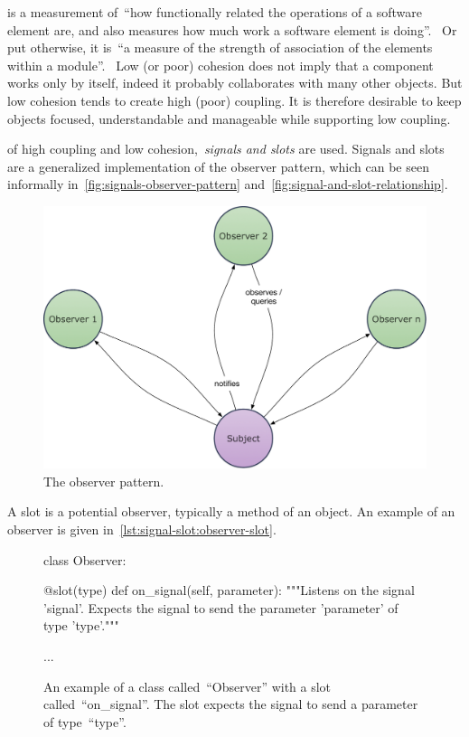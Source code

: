 \documentclass[%
    a4paper,    %
    justified,  %
    nobib,      %
    openany     %
]{tufte-book}
\makeatletter
\renewcommand{\label}[1]{\@tufte@label{##1}}%
\makeatother
\begin{document}
 is a measurement of~\enquote{how functionally related the
operations of a software element are, and also measures how much work a software
element is doing}.~\cite{larman-applying-2004} Or put otherwise, it
is~\enquote{a measure of the strength of association of the elements within a
module}.~\cite[p. 52]{ieee-swebok-2014} Low (or poor) cohesion does not imply
that a component works only by itself, indeed it probably collaborates with many
other objects. But low cohesion tends to create high (poor) coupling. It is
therefore desirable to keep objects focused, understandable and manageable while
supporting low coupling.~\cite{larman-applying-2004}

 of high coupling and low
cohesion,~\emph{signals and slots} are used. Signals and slots are a generalized
implementation of the observer pattern, which can be seen informally
in~\cref{fig:signals-observer-pattern}
and~\cref{fig:signal-and-slot-relationship}.

\begin{figure}[!htbp]
  \includegraphics[width=0.8\linewidth]{images/observer-pattern}
  \caption{The observer pattern.~\cite{gamma-dpe-1995}}
\label{fig:signals-observer-pattern}
\end{figure}

 A slot is a potential observer,
typically a method of an object. An example of an observer is given
in~\cref{lst:signal-slot:observer-slot}.

\begin{figure}[!htbp]
  \begin{pythoncode}
class Observer:

    @slot(type)
    def on_signal(self, parameter):
        """Listens on the signal 'signal'. Expects the
        signal to send the parameter 'parameter' of
        type 'type'."""

        ...
  \end{pythoncode}
  \caption{An example of a class called~\enquote{Observer} with a slot
    called~\enquote{on\_signal}. The slot expects the signal to send a parameter
    of type~\enquote{type}.
  }
\label{lst:signal-slot:observer-slot}
\end{figure}
\end{document}
